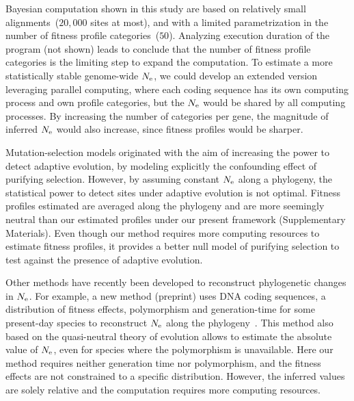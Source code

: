 Bayesian computation shown in this study are based on relatively small alignments~($20,000$ sites at most), and with a limited parametrization in the number of fitness profile categories~($50$).
Analyzing execution duration of the program (not shown) leads to conclude that the number of fitness profile categories is the limiting step to expand the computation.
To estimate a more statistically stable genome-wide $N_{\mathrm{e}}$, we could develop an extended version leveraging parallel computing, where each coding sequence has its own computing process and own profile categories, but the $N_{\mathrm{e}}$ would be shared by all computing processes.
By increasing the number of categories per gene, the magnitude of inferred $N_{\mathrm{e}}$ would also increase, since fitness profiles would be sharper.

Mutation-selection models originated with the aim of increasing the power to detect adaptive evolution, by modeling explicitly the confounding effect of purifying selection.
However, by assuming constant $N_{\mathrm{e}}$ along a phylogeny, the statistical power to detect sites under adaptive evolution is not optimal.
Fitness profiles estimated are averaged along the phylogeny and are more seemingly \gls{neutral} than our estimated profiles under our present framework (Supplementary Materials).
Even though our method requires more computing resources to estimate fitness profiles, it provides a better null model of purifying selection to test against the presence of adaptive evolution.

Other methods have recently been developed to reconstruct phylogenetic changes in $N_{\mathrm{e}}$.
For example, a new method (preprint) uses \acrshort{DNA} coding sequences, a distribution of fitness effects, polymorphism and generation-time for some present-day species to reconstruct $N_{\mathrm{e}}$ along the phylogeny~\citep{Brevet2019}.
This method also based on the quasi-neutral theory of evolution allows to estimate the absolute value of $N_{\mathrm{e}}$, even for species where the polymorphism is unavailable.
Here our method requires neither generation time nor polymorphism, and the fitness effects are not constrained to a specific distribution.
However, the inferred values are solely relative and the computation requires more computing resources.

